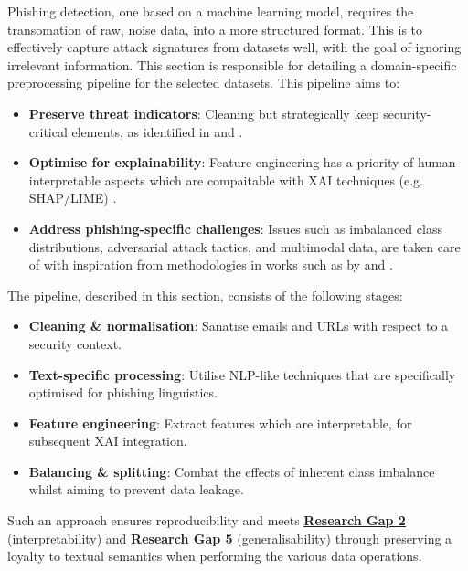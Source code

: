
Phishing detection, one based on a machine learning model, requires the transomation of raw, noise data, into a more structured format. This is to effectively capture attack signatures from datasets well, with the goal of ignoring irrelevant information. This section is responsible for detailing a domain-specific preprocessing pipeline for the selected datasets. This pipeline aims to:

\begin{itemize}
  \item \textbf{Preserve threat indicators}: Cleaning but strategically keep security-critical elements, as identified in \cite{greco2023explaining} and \cite{lin2021phishpedia}.
  \item \textbf{Optimise for explainability}: Feature engineering has a priority of human-interpretable aspects which are compaitable with XAI techniques (e.g. SHAP/LIME) \citep{shendkar2024enhancing}.
  \item \textbf{Address phishing-specific challenges}: Issues such as imbalanced class distributions, adversarial attack tactics, and multimodal data, are taken care of with inspiration from methodologies in works such as by \cite{zamir2020phishing} and \cite{ahmad2024across}.
\end{itemize}

\noindent The pipeline, described in this section, consists of the following stages:

\begin{itemize}
  \item \textbf{Cleaning \& normalisation}: Sanatise emails and URLs with respect to a security context.
  \item \textbf{Text-specific processing}: Utilise NLP-like techniques that are specifically optimised for phishing linguistics.
  \item \textbf{Feature engineering}: Extract features which are interpretable, for subsequent XAI integration.
  \item \textbf{Balancing \& splitting}: Combat the effects of inherent class imbalance whilst aiming to prevent data leakage.
\end{itemize}

\noindent Such an approach ensures reproducibility and meets \hyperref[research-gap-5]{\uline{\textbf{Research Gap 2}}} (interpretability) and \hyperref[research-gap-5]{\uline{\textbf{Research Gap 5}}} (generalisability) through preserving a loyalty to textual semantics when performing the various data operations.
